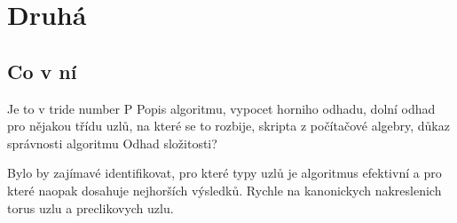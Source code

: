 \chapter{Druhá}


\section{Co v ní}
Je to v tride number P  
Popis algoritmu, vypocet horniho odhadu, dolní odhad pro nějakou třídu uzlů, na které se to rozbije, skripta z počítačové algebry, důkaz správnosti algoritmu
Odhad složitosti?


Bylo by zajímavé identifikovat, pro které typy uzlů je algoritmus efektivní a pro které naopak dosahuje nejhorších výsledků.
Rychle na kanonickych nakreslenich torus uzlu a preclikovych uzlu.